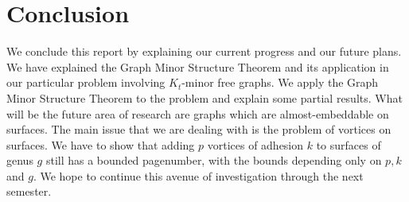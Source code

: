 \documentclass[]{report}
\theoremstyle{definition}
\numberwithin{theorem}{section}
\numberwithin{equation}{section}
\begin{document}
\chapter{Conclusion}\label{chap:conclusion}
We conclude this report by explaining our current progress and our future plans. We have explained the Graph Minor Structure Theorem \cite{robertsonGraphMinorsXVI2003} and its application in our particular problem involving $K_t$-minor free graphs. We apply the Graph Minor Structure Theorem to the problem and explain some partial results. What will be the future area of research are graphs which are almost-embeddable on surfaces. The main issue that we are dealing with is the problem of vortices on surfaces. We have to show that adding $p$ vortices of adhesion $k$ to surfaces of genus $g$ still has a bounded pagenumber, with the bounds depending only on $p, k$ and $g$. We hope to continue this avenue of investigation through the next semester. 
\printbibliography
\end{document}
